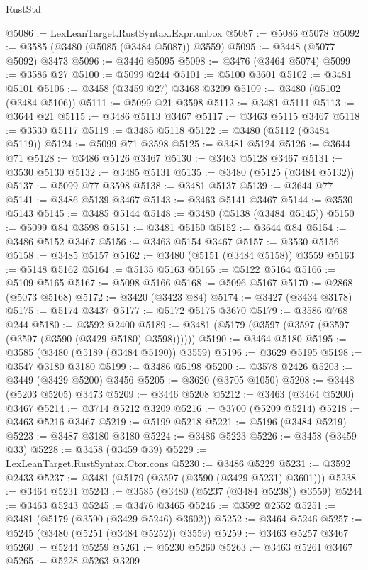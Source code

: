 \begin{lexlean}{RustStd}
\begin{coremodule}
{{{{{{{{{{{{{{{{{{{@5086 := LexLeanTarget.RustSyntax.Expr.unbox
@5087 := @5086 @5078
@5092 := @3585 (@3480 (@5085 (@3484 @5087)) @3559)
@5095 := @3448 (@5077 @5092) @3473
@5096 := @3446 @5095
@5098 := @3476 (@3464 @5074)
@5099 := @3586 @27
@5100 := @5099 @244
@5101 := @5100 @3601
@5102 := @3481 @5101
@5106 := @3458 (@3459 @27) @3468 @3209
@5109 := @3480 (@5102 (@3484 @5106))
@5111 := @5099 @21 @3598
@5112 := @3481 @5111
@5113 := @3644 @21
@5115 := @3486 @5113 @3467
@5117 := @3463 @5115 @3467
@5118 := @3530 @5117
@5119 := @3485 @5118
@5122 := @3480 (@5112 (@3484 @5119))
@5124 := @5099 @71 @3598
@5125 := @3481 @5124
@5126 := @3644 @71
@5128 := @3486 @5126 @3467
@5130 := @3463 @5128 @3467
@5131 := @3530 @5130
@5132 := @3485 @5131
@5135 := @3480 (@5125 (@3484 @5132))
@5137 := @5099 @77 @3598
@5138 := @3481 @5137
@5139 := @3644 @77
@5141 := @3486 @5139 @3467
@5143 := @3463 @5141 @3467
@5144 := @3530 @5143
@5145 := @3485 @5144
@5148 := @3480 (@5138 (@3484 @5145))
@5150 := @5099 @84 @3598
@5151 := @3481 @5150
@5152 := @3644 @84
@5154 := @3486 @5152 @3467
@5156 := @3463 @5154 @3467
@5157 := @3530 @5156
@5158 := @3485 @5157
@5162 := @3480 (@5151 (@3484 @5158)) @3559
@5163 := @5148 @5162
@5164 := @5135 @5163
@5165 := @5122 @5164
@5166 := @5109 @5165
@5167 := @5098 @5166
@5168 := @5096 @5167
@5170 := @2868 (@5073 @5168)
@5172 := @3420 (@3423 @84)
@5174 := @3427 (@3434 @3178)
@5175 := @5174 @3437
@5177 := @5172 @5175 @3670
@5179 := @3586 @768 @244
@5180 := @3592 @2400
@5189 := @3481 (@5179 (@3597 (@3597 (@3597 (@3597 (@3590 (@3429 @5180) @3598))))))
@5190 := @3464 @5180
@5195 := @3585 (@3480 (@5189 (@3484 @5190)) @3559)
@5196 := @3629 @5195
@5198 := @3547 @3180 @3180
@5199 := @3486 @5198
@5200 := @3578 @2426
@5203 := @3449 (@3429 @5200) @3456
@5205 := @3620 (@3705 @1050)
@5208 := @3448 (@5203 @5205) @3473
@5209 := @3446 @5208
@5212 := @3463 (@3464 @5200) @3467
@5214 := @3714 @5212 @3209
@5216 := @3700 (@5209 @5214)
@5218 := @3463 @5216 @3467
@5219 := @5199 @5218
@5221 := @5196 (@3484 @5219)
@5223 := @3487 @3180 @3180
@5224 := @3486 @5223
@5226 := @3458 (@3459 @33)
@5228 := @3458 (@3459 @39)
@5229 := LexLeanTarget.RustSyntax.Ctor.cons
@5230 := @3486 @5229
@5231 := @3592 @2433
@5237 := @3481 (@5179 (@3597 (@3590 (@3429 @5231) @3601)))
@5238 := @3464 @5231
@5243 := @3585 (@3480 (@5237 (@3484 @5238)) @3559)
@5244 := @3463 @5243
@5245 := @3476 @3465
@5246 := @3592 @2552
@5251 := @3481 (@5179 (@3590 (@3429 @5246) @3602))
@5252 := @3464 @5246
@5257 := @5245 (@3480 (@5251 (@3484 @5252)) @3559)
@5259 := @3463 @5257 @3467
@5260 := @5244 @5259
@5261 := @5230 @5260
@5263 := @3463 @5261 @3467
@5265 := @5228 @5263 @3209
}}}}}}}}}}}}}}}}}}}
\end{coremodule}
\end{lexlean}
